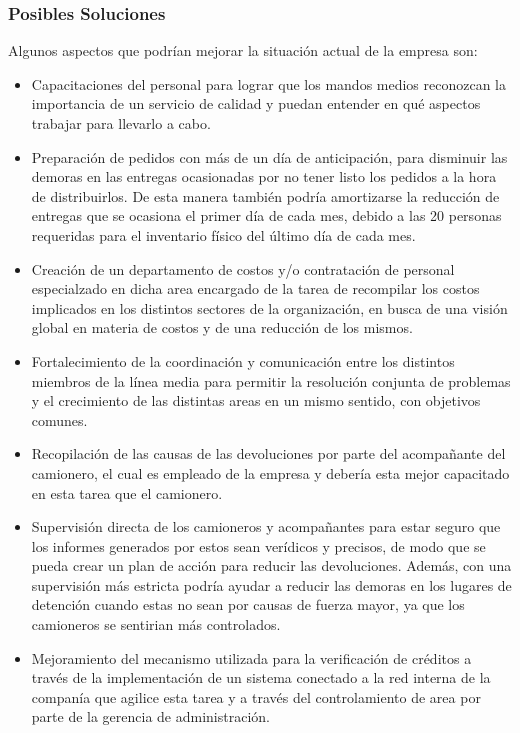 \documentclass[a4paper,10pt]{article}
\begin{document}
	\subsubsection{Posibles Soluciones}

Algunos aspectos que podrían mejorar la situación actual de la empresa son:

\begin{itemize}
\item Capacitaciones del personal para lograr que los mandos medios reconozcan la importancia de un servicio de calidad y puedan entender en qué aspectos trabajar para llevarlo a cabo.
\item Preparación de pedidos con más de un día de anticipación, para disminuir las demoras en las entregas ocasionadas por no tener listo los pedidos a la hora de distribuirlos. De esta manera también podría amortizarse la reducción de entregas que se ocasiona el primer día de cada mes, debido a las 20 personas requeridas para el inventario físico del último día de cada mes. 
\item Creación de un departamento de costos y/o contratación de personal especialzado en dicha area encargado de la tarea de recompilar los costos implicados en los distintos sectores de la organización, en busca de una visión global en materia de costos y de una reducción de los mismos.
\item Fortalecimiento de la coordinación y comunicación entre los distintos miembros de la línea media para permitir la resolución conjunta de problemas y el crecimiento de las distintas areas en un mismo sentido, con objetivos comunes.
\item Recopilación de las causas de las devoluciones por parte del acompañante del camionero, el cual es empleado de la empresa y debería esta mejor capacitado en esta tarea que el camionero.
\item Supervisión directa de los camioneros y acompañantes para estar seguro que los informes generados por estos sean verídicos y precisos, de modo que se pueda crear un plan de acción para reducir las devoluciones. Además, con una supervisión más estricta podría ayudar a reducir las demoras en los lugares de detención cuando estas no sean por causas de fuerza mayor, ya que los camioneros se sentirian más controlados.
\item Mejoramiento del mecanismo utilizada para la verificación de créditos a través de la implementación de un sistema conectado a la red interna de la companía que agilice esta tarea y a través del controlamiento de area por parte de la gerencia de administración.

\end{itemize}
\end{document}
